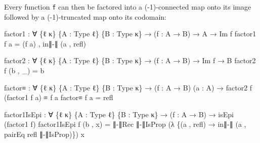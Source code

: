 \documentclass[
  11pt,
  oneside,
  article]{memoir}
\newenvironment{Shaded}{}{}
\newcommand{\NormalTok}[1]{#1}
\newcommand{\OtherTok}[1]{\textcolor[rgb]{0.00,0.44,0.13}{#1}}
\theoremstyle{definition}
\theoremstyle{plain}
\newcommand{\0}{\textsf{0}}
\newcommand{\1}{\tn{\textsf{1}}}
\begin{document}
Every function \texttt{f} can then be factored into a (-1)-connected map
onto its image followed by a (-1)-truncated map onto its codomain:

\begin{Shaded}
\begin{Highlighting}[]
\NormalTok{factor1 }\OtherTok{:} \OtherTok{∀} \OtherTok{\{}\NormalTok{ℓ κ}\OtherTok{\}} \OtherTok{\{}\NormalTok{A }\OtherTok{:}\NormalTok{ Type ℓ}\OtherTok{\}} \OtherTok{\{}\NormalTok{B }\OtherTok{:}\NormalTok{ Type κ}\OtherTok{\}} \OtherTok{→} \OtherTok{(}\NormalTok{f }\OtherTok{:}\NormalTok{ A }\OtherTok{→}\NormalTok{ B}\OtherTok{)} \OtherTok{→}\NormalTok{ A }\OtherTok{→}\NormalTok{ Im f}
\NormalTok{factor1 f a }\OtherTok{=} \OtherTok{(}\NormalTok{f a}\OtherTok{)}\NormalTok{ , in∥{-}∥ }\OtherTok{(}\NormalTok{a , refl}\OtherTok{)}

\NormalTok{factor2 }\OtherTok{:} \OtherTok{∀} \OtherTok{\{}\NormalTok{ℓ κ}\OtherTok{\}} \OtherTok{\{}\NormalTok{A }\OtherTok{:}\NormalTok{ Type ℓ}\OtherTok{\}} \OtherTok{\{}\NormalTok{B }\OtherTok{:}\NormalTok{ Type κ}\OtherTok{\}} \OtherTok{→} \OtherTok{(}\NormalTok{f }\OtherTok{:}\NormalTok{ A }\OtherTok{→}\NormalTok{ B}\OtherTok{)} \OtherTok{→}\NormalTok{ Im f }\OtherTok{→}\NormalTok{ B}
\NormalTok{factor2 f }\OtherTok{(}\NormalTok{b , }\OtherTok{\_)} \OtherTok{=}\NormalTok{ b}

\NormalTok{factor≡ }\OtherTok{:} \OtherTok{∀} \OtherTok{\{}\NormalTok{ℓ κ}\OtherTok{\}} \OtherTok{\{}\NormalTok{A }\OtherTok{:}\NormalTok{ Type ℓ}\OtherTok{\}} \OtherTok{\{}\NormalTok{B }\OtherTok{:}\NormalTok{ Type κ}\OtherTok{\}} 
          \OtherTok{→} \OtherTok{(}\NormalTok{f }\OtherTok{:}\NormalTok{ A }\OtherTok{→}\NormalTok{ B}\OtherTok{)} \OtherTok{(}\NormalTok{a }\OtherTok{:}\NormalTok{ A}\OtherTok{)} \OtherTok{→}\NormalTok{ factor2 f }\OtherTok{(}\NormalTok{factor1 f a}\OtherTok{)}\NormalTok{ ≡ f a}
\NormalTok{factor≡ f a }\OtherTok{=}\NormalTok{ refl}

\NormalTok{factor1IsEpi }\OtherTok{:} \OtherTok{∀} \OtherTok{\{}\NormalTok{ℓ κ}\OtherTok{\}} \OtherTok{\{}\NormalTok{A }\OtherTok{:}\NormalTok{ Type ℓ}\OtherTok{\}} \OtherTok{\{}\NormalTok{B }\OtherTok{:}\NormalTok{ Type κ}\OtherTok{\}}
               \OtherTok{→} \OtherTok{(}\NormalTok{f }\OtherTok{:}\NormalTok{ A }\OtherTok{→}\NormalTok{ B}\OtherTok{)} \OtherTok{→}\NormalTok{ isEpi }\OtherTok{(}\NormalTok{factor1 f}\OtherTok{)}
\NormalTok{factor1IsEpi f }\OtherTok{(}\NormalTok{b , x}\OtherTok{)} \OtherTok{=} 
\NormalTok{    ∥{-}∥Rec ∥{-}∥IsProp }
          \OtherTok{(λ} \OtherTok{\{(}\NormalTok{a , refl}\OtherTok{)} \OtherTok{→}\NormalTok{ in∥{-}∥ }\OtherTok{(}\NormalTok{a , pairEq refl ∥{-}∥IsProp}\OtherTok{)\})} 
\NormalTok{          x}


\end{Highlighting}
\end{Shaded}
\end{document}
